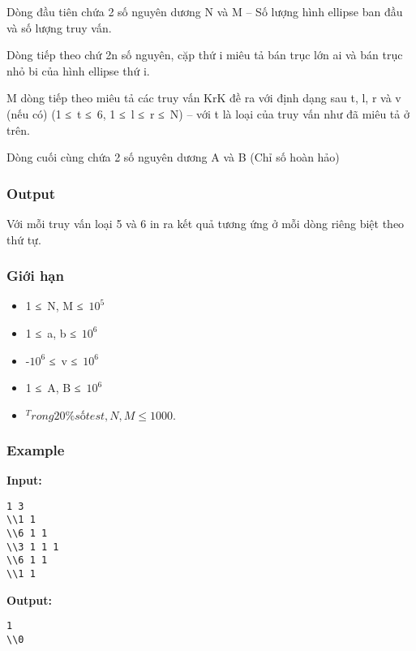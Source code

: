    Dòng đầu tiên chứa 2 số nguyên dương N và M – Số lượng hình ellipse ban đầu và số lượng truy vấn.  

   Dòng tiếp theo chứ 2n số nguyên, cặp thứ i miêu tả bán trục lớn ai và bán trục nhỏ bi của hình ellipse thứ i.  

   M dòng tiếp theo miêu tả các truy vấn KrK đề ra với định dạng sau t, l, r và v (nếu có) (1 ≤ t ≤ 6, 1 ≤ l ≤ r ≤ N) – với t là loại của truy vấn như đã miêu tả ở trên.  

   Dòng cuối cùng chứa 2 số nguyên dương A và B (Chỉ số hoàn hảo)  

\subsubsection{   Output  }

   Với mỗi truy vấn loại 5 và 6 in ra kết quả tương ứng ở mỗi dòng riêng biệt theo thứ tự.  

\subsubsection{   Giới hạn  }


\begin{itemize}
	\item     1 ≤ N, M ≤ $10^{5}$
	\item     1 ≤ a, b ≤ $10^{6}$
	\item     -$10^{6}$    ≤ v ≤ $10^{6}$
	\item     1 ≤ A, B ≤ $10^{6}$
	\item $^     Trong 20\% số test, N, M ≤ 1000.    $
\end{itemize}



\subsubsection{   Example  }

\textbf{    Input:   }
\begin{verbatim}
1 3
\\1 1
\\6 1 1 
\\3 1 1 1 
\\6 1 1
\\1 1\end{verbatim}

\textbf{    Output:   }
\begin{verbatim}
1
\\0\end{verbatim}
